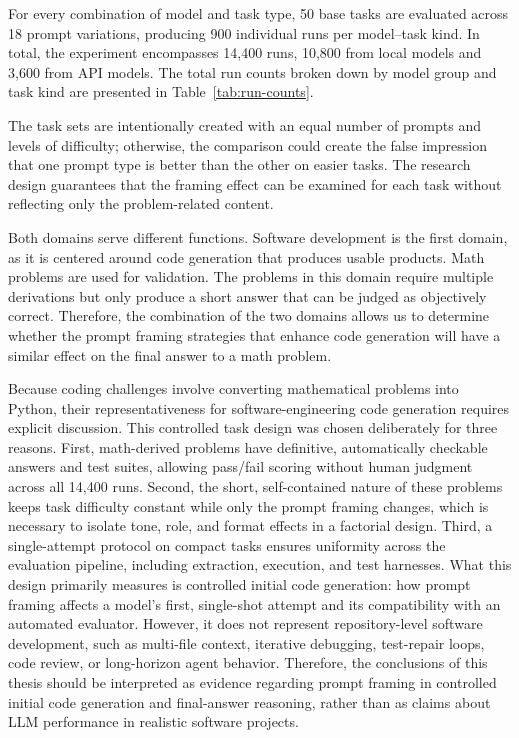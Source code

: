 For every combination of model and task type, 50 base tasks are evaluated across 18 prompt variations, producing 900 individual runs per model--task kind. In total, the experiment encompasses 14,400 runs, 10,800 from local models and 3,600 from API models. The total run counts broken down by model group and task kind are presented in Table~\ref{tab:run-counts}.

The task sets are intentionally created with an equal number of prompts and levels of difficulty; otherwise, the comparison could create the false impression that one prompt type is better than the other on easier tasks. The research design guarantees that the framing effect can be examined for each task without reflecting only the problem-related content.

Both domains serve different functions. Software development is the first domain, as it is centered around code generation that produces usable products. Math problems are used for validation. The problems in this domain require multiple derivations but only produce a short answer that can be judged as objectively correct. Therefore, the combination of the two domains allows us to determine whether the prompt framing strategies that enhance code generation will have a similar effect on the final answer to a math problem.

Because coding challenges involve converting mathematical problems into Python, their representativeness for software-engineering code generation requires explicit discussion. This controlled task design was chosen deliberately for three reasons. First, math-derived problems have definitive, automatically checkable answers and test suites, allowing pass/fail scoring without human judgment across all 14,400 runs. Second, the short, self-contained nature of these problems keeps task difficulty constant while only the prompt framing changes, which is necessary to isolate tone, role, and format effects in a factorial design. Third, a single-attempt protocol on compact tasks ensures uniformity across the evaluation pipeline, including extraction, execution, and test harnesses. What this design primarily measures is controlled initial code generation: how prompt framing affects a model's first, single-shot attempt and its compatibility with an automated evaluator. However, it does not represent repository-level software development, such as multi-file context, iterative debugging, test-repair loops, code review, or long-horizon agent behavior. Therefore, the conclusions of this thesis should be interpreted as evidence regarding prompt framing in controlled initial code generation and final-answer reasoning, rather than as claims about LLM performance in realistic software projects.


